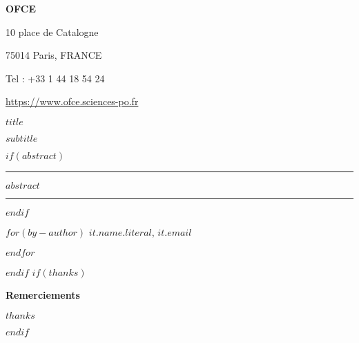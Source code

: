 \begin{titlepage}
{\begin{minipage}[b]{40em}
{        \textbf{OFCE}

        10 place de Catalogne

        75014 Paris, FRANCE

        Tel : +33 1 44 18 54 24

        \url{https://www.ofce.sciences-po.fr}
      }
    \end{minipage}
}
\newpage
\pagestyle{empty}

\LARGE\textbf{$title$}

\large\textbf{$subtitle$}

\vspace{1cm}

$if(abstract)$

\par\rule{\textwidth}{0.5pt}

$abstract$

\par\rule{\textwidth}{0.5pt}

$endif$

\vspace{1cm}

\begin{flushright}
$for(by-author)$
   \linespread{1}\small{\textbf{$it.name.literal$}}, {\small{$it.email$}}\par
$endfor$ %
\end{flushright}
$endif$
$if(thanks)$
\vspace{2.5cm}
\begin{minipage}[b]{40em}
  \textcolor{scporouge}{
    \textbf{Remerciements}}{

      \vspace{0.2cm}
      \vspace{0.2cm}

    \textit{\small{$thanks$}}
  }
\end{minipage}
$endif$
\end{titlepage}

